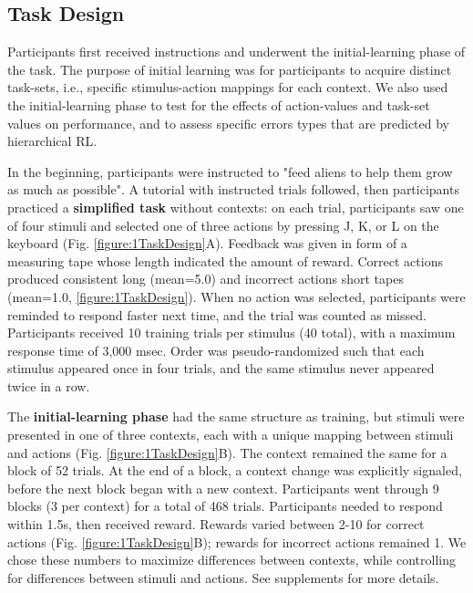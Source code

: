 \documentclass[10pt,letterpaper]{article}  %
\begin{document}
\subsection*{Task Design}

Participants first received instructions and underwent the initial-learning phase of the task. The purpose of initial learning was for participants to acquire distinct task-sets, i.e., specific stimulus-action mappings for each context. We also used the initial-learning phase to test for the effects of action-values and task-set values on performance, and to assess specific errors types that are predicted by hierarchical RL.

In the beginning, participants were instructed to "feed aliens to help them grow as much as possible". A tutorial with instructed trials followed, then participants practiced a \textbf{simplified task} without contexts: on each trial, participants saw one of four stimuli and selected one of three actions by pressing J, K, or L on the keyboard (Fig. \ref{figure:1TaskDesign}A). Feedback was given in form of a measuring tape whose length indicated the amount of reward. Correct actions produced consistent long (mean=5.0) and incorrect actions short tapes (mean=1.0, \ref{figure:1TaskDesign}).
When no action was selected, participants were reminded to respond faster next time, and the trial was counted as missed.
Participants received 10 training trials per stimulus (40 total), with a maximum response time of 3,000 msec. Order was pseudo-randomized such that each stimulus appeared once in four trials, and the same stimulus never appeared twice in a row.

The \textbf{initial-learning phase} had the same structure as training, but
stimuli were presented in one of three contexts, each with a unique mapping between stimuli and actions (Fig. \ref{figure:1TaskDesign}B). The context remained the same for a block of 52 trials. At the end of a block, a context change was explicitly signaled, before the next block began with a new context. Participants went through 9 blocks (3 per context) for a total of 468 trials.
Participants needed to respond within 1.5s, then received reward. Rewards varied between 2-10 for correct actions (Fig. \ref{figure:1TaskDesign}B); rewards for incorrect actions remained 1. We chose these numbers to maximize differences between contexts, while controlling for differences between stimuli and actions. See supplements for more details.
\end{document}
